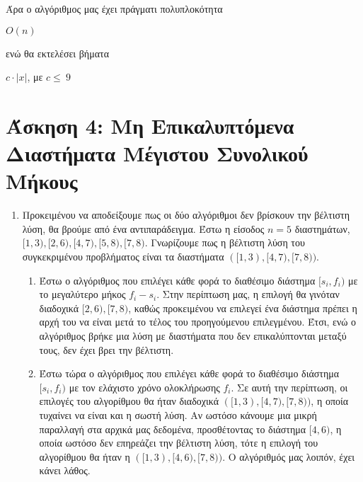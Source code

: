 \documentclass{article}
\begin{document}
Άρα ο αλγόριθμος μας έχει πράγματι πολυπλοκότητα 
\begin{center}
$O(n)$
\end{center} ενώ θα εκτελέσει βήματα 

\begin{center}
$c \cdot \lvert x \rvert$, με $c \leq\ 9$
\end{center} 

\section*{\large Άσκηση 4: Μη Επικαλυπτόμενα Διαστήματα Μέγιστου Συνολικού Μήκους}
\begin{enumerate} 
	\item Προκειμένου να αποδείξουμε πως οι δύο αλγόριθμοι δεν βρίσκουν την βέλτιστη λύση, θα βρούμε από ένα αντιπαράδειγμα. Έστω η είσοδος $n = 5$ διαστημάτων, $[1, 3), [2, 6), [4, 7), [5, 8), [7, 8)$. Γνωρίζουμε πως η βέλτιστη λύση του συγκεκριμένου προβλήματος είναι τα διαστήματα $([1, 3), [4, 7), [7, 8))$. 
	\begin{enumerate} [label=(\alph*)]
	\item Έστω ο αλγόριθμος που επιλέγει κάθε φορά το διαθέσιμο διάστημα $[s_i, f_i)$ με το μεγαλύτερο μήκος $f_i - s_i$. Στην περίπτωση μας, η επιλογή θα γινόταν διαδοχικά $[2, 6), [7, 8)$, καθώς προκειμένου να επιλεγεί ένα διάστημα πρέπει η αρχή του να είναι μετά το τέλος του προηγούμενου επιλεγμένου. Έτσι, ενώ ο αλγόριθμος βρήκε μια λύση με διαστήματα που δεν επικαλύπτονται μεταξύ τους, δεν έχει βρει την βέλτιστη. 
	\item Έστω τώρα ο αλγόριθμος που επιλέγει κάθε φορά το διαθέσιμο διάστημα $[s_i, f_i)$ με τον ελάχιστο χρόνο ολοκλήρωσης $f_i$. Σε αυτή την περίπτωση, οι επιλογές του αλγορίθμου θα ήταν διαδοχικά $([1, 3), [4, 7), [7, 8))$, η οποία τυχαίνει να είναι και η σωστή λύση. Αν ωστόσο κάνουμε μια μικρή παραλλαγή στα αρχικά μας δεδομένα, προσθέτοντας το διάστημα $[4, 6)$, η οποία ωστόσο δεν επηρεάζει την βέλτιστη λύση, τότε η επιλογή του αλγορίθμου θα ήταν η $([1, 3), [4, 6), [7, 8))$. Ο αλγόριθμός μας λοιπόν, έχει κάνει λάθος. 
\end{enumerate}


\end{enumerate}
\end{document}
